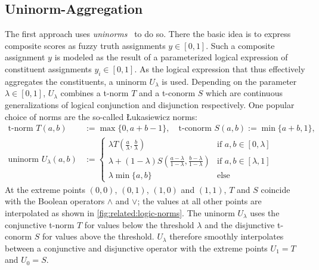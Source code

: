 \subsection{Uninorm-Aggregation}%
\label{sec:related:lta:uninorm}

The first approach uses \textit{uninorms}~\cite{Melnikov2016} to do so.
There the basic idea is to express composite scores as fuzzy truth assignments $y \in [0, 1]$.
Such a composite assignment $y$ is modeled as the result of a parameterized logical expression of constituent assignments $y_i \in [0, 1]$.
As the logical expression that thus effectively aggregates the constituents, a uninorm $U_{\lambda}$ is used.
Depending on the parameter $\lambda \in [0, 1]$, $U_{\lambda}$ combines a t-norm $T$ and a t-conorm $S$ which are continuous generalizations of logical conjunction and disjunction respectively.
One popular choice of norms are the so-called Łukasiewicz norms:
\begin{align}
	\text{t-norm } T(a, b) &:= \max \{ 0, a + b - 1 \}, \quad\text{t-conorm } S(a, b) := \min \{ a + b, 1 \}, \nonumber \\
	\text{uninorm } U_\lambda(a, b) &:= \begin{cases}
		\lambda T\left(\frac{a}{\lambda}, \frac{b}{\lambda}\right) & \text{if } a, b \in [0, \lambda] \\
		\lambda + (1 - \lambda) S\left(\frac{a - \lambda}{1 - \lambda}, \frac{b - \lambda}{1 - \lambda}\right) & \text{if } a, b \in [\lambda, 1] \\
		\lambda \min \{ a, b \} & \text{else}
	\end{cases}
\end{align}
At the extreme points $(0, 0)$, $(0, 1)$, $(1, 0)$ and $(1, 1)$, $T$ and $S$ coincide with the Boolean operators $\land$ and $\lor$;
the values at all other points are interpolated as shown in \cref{fig:related:logic-norms}.
The uninorm $U_\lambda$ uses the conjunctive t-norm $T$ for values below the threshold $\lambda$ and the disjunctive t-conorm $S$ for values above the threshold.
$U_\lambda$ therefore smoothly interpolates between a conjunctive and disjunctive operator with the extreme points $U_1 = T$ and $U_0 = S$.
